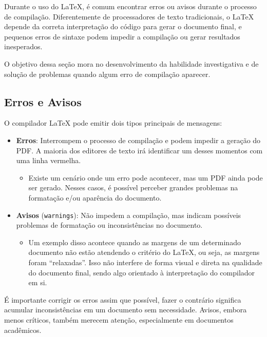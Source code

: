\documentclass{article}
\begin{document}
Durante o uso do \LaTeX, é comum encontrar erros ou avisos durante o processo de compilação. Diferentemente de processadores de texto tradicionais, o \LaTeX\hspace{1pt} depende da correta interpretação do código para gerar o documento final, e pequenos erros de sintaxe podem impedir a compilação ou gerar resultados inesperados.

O objetivo dessa seção mora no desenvolvimento da habilidade investigativa e de solução de problemas quando algum erro de compilação aparecer.

\subsection{Erros e Avisos}

O compilador \LaTeX\hspace{1pt} pode emitir dois tipos principais de mensagens:

\begin{itemize}
	\item \textbf{Erros}: Interrompem o processo de compilação e podem impedir a geração do PDF. A maioria dos editores de texto irá identificar um desses momentos com uma linha vermelha. 
	\begin{itemize}
		\item Existe um cenário onde um erro pode acontecer, mas um PDF ainda pode ser gerado. Nesses casos, é possível perceber grandes problemas na formatação e/ou aparência do documento.
	\end{itemize}
	\item \textbf{Avisos} (\texttt{warnings}): Não impedem a compilação, mas indicam possíveis problemas de formatação ou inconsistências no documento.
	\begin{itemize}
		\item Um exemplo disso acontece quando as margens de um determinado documento não estão atendendo o critério do \LaTeX, ou seja, as margens foram ``relaxadas''. Isso não interfere de forma visual e direta na qualidade do documento final, sendo algo orientado à interpretação do compilador em si.
	\end{itemize}
\end{itemize}

É importante corrigir os erros assim que possível, fazer o contrário significa acumular inconsistências em um documento sem necessidade. Avisos, embora menos críticos, também merecem atenção, especialmente em documentos acadêmicos.
\end{document}
